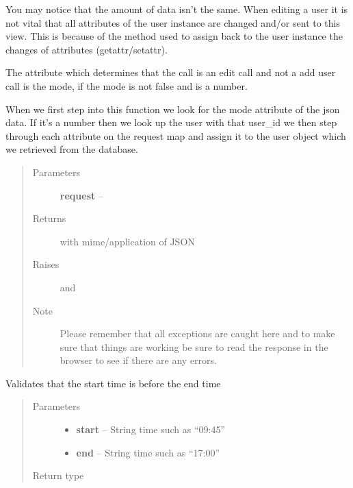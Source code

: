 \documentclass[letterpaper,10pt,english]{sphinxmanual}
\begin{document}
\begin{fulllineitems}
You may notice that the amount of data isn't the same. When editing a user
it is not vital that all attributes of the user instance are changed
and/or sent to this view. This is because of the method used to assign
back to the user instance the changes of attributes (getattr/setattr).

The attribute which determines that the call is an edit call and not a add
user call is the mode, if the mode is not false and is a number.

When we first step into this function we look for the mode attribute of
the json data. If it's a number then we look up the user with that user\_id
we then step through each attribute on the request map and assign it to
the user object which we retrieved from the database.
\begin{quote}\begin{description}
\item[{Parameters}] \leavevmode
\textbf{request} -- 

\item[{Returns}] \leavevmode
{} with mime/application of JSON

\item[{Raises }] \leavevmode
{}  and 

\item[{Note }] \leavevmode
Please remember that all exceptions are caught here and to make
sure that things are working be sure to read the response in the
browser to see if there are any errors.

\end{description}\end{quote}

\end{fulllineitems}


\begin{fulllineitems}
\label{timetracker:timetracker.utils.calendar_utils.validate_time}
Validates that the start time is before the end time
\begin{quote}\begin{description}
\item[{Parameters}] \leavevmode\begin{itemize}
\item {} 
\textbf{start} -- String time such as ``09:45''

\item {} 
\textbf{end} -- String time such as ``17:00''

\end{itemize}

\item[{Return type}] \leavevmode
{}

\end{description}\end{quote}

\end{fulllineitems}
\end{document}
